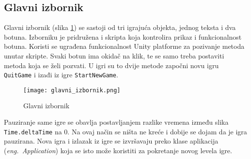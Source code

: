 \subsection{Glavni izbornik}
Glavni izbornik (slika \ref{fig:glavniIzbornik}) se sastoji od tri igrajuća objekta, jednog teksta i dva botuna. Izborniku je pridružena i skripta koja kontrolira prikaz i funkcionalnost botuna. Koristi se ugrađena funkcionalnost Unity platforme za pozivanje metoda unutar skripte. Svaki botun ima okidač na klik, te se samo treba postaviti metoda koja se želi pozvati. U igri su to dvije metode započni novu igru \texttt{QuitGame} i izađi iz igre \texttt{StartNewGame}. 
\begin{figure}[h]
	\texttt{[image: glavni\_izbornik.png]}
	\centering
	\caption{Glavni izbornik}
	\label{fig:glavniIzbornik}
\end{figure}

Pauziranje same igre se obavlja postavljanjem razlike vremena između slika \texttt{Time.deltaTime} na 0. Na ovaj način se ništa ne kreće i dobije se dojam da je igra pauzirana. Nova igra i izlazak iz igre se izvršavaju preko klase aplikacija (\emph{eng.~Application}) koja se isto može koristiti za pokretanje novog levela igre.